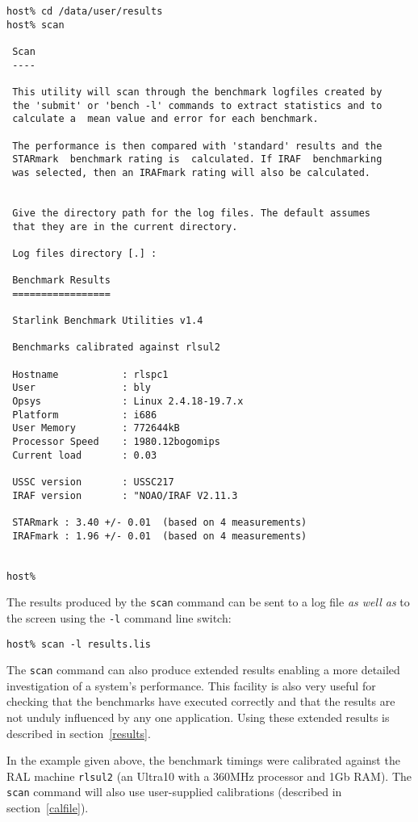 \begin{verbatim}
host% cd /data/user/results
host% scan

 Scan
 ----

 This utility will scan through the benchmark logfiles created by
 the 'submit' or 'bench -l' commands to extract statistics and to
 calculate a  mean value and error for each benchmark.

 The performance is then compared with 'standard' results and the
 STARmark  benchmark rating is  calculated. If IRAF  benchmarking
 was selected, then an IRAFmark rating will also be calculated.


 Give the directory path for the log files. The default assumes
 that they are in the current directory.

 Log files directory [.] :

 Benchmark Results
 =================

 Starlink Benchmark Utilities v1.4

 Benchmarks calibrated against rlsul2

 Hostname           : rlspc1
 User               : bly
 Opsys              : Linux 2.4.18-19.7.x
 Platform           : i686
 User Memory        : 772644kB
 Processor Speed    : 1980.12bogomips
 Current load       : 0.03

 USSC version	    : USSC217
 IRAF version	    : "NOAO/IRAF V2.11.3

 STARmark : 3.40 +/- 0.01  (based on 4 measurements)
 IRAFmark : 1.96 +/- 0.01  (based on 4 measurements)


host%
\end{verbatim}

The results produced by the {\tt scan} command can be sent to a log file
{\em as well as} to the screen using the {\tt -l} command line switch:

{\tt host\% scan -l results.lis}

The {\tt scan} command can also produce extended results enabling a
more detailed investigation of a system's performance. This facility is
also very useful for checking that the benchmarks have executed correctly
and that the results are not unduly influenced by any one application.
Using these extended results is described in section~\ref{results}.

In the example given above, the benchmark timings were calibrated
against the RAL machine {\tt rlsul2} (an Ultra10 with a 360MHz
processor and 1Gb RAM). The {\tt scan} command will also use user-supplied
calibrations (described in section~\ref{calfile}).

